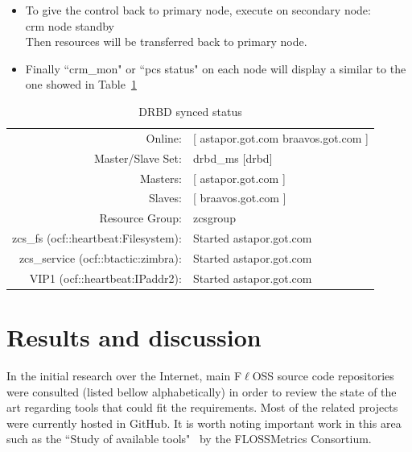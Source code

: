 \documentclass[a4paper, 12pt]{book}
\begin{document}
\begin{itemize}
	\item To give the control back to primary node, execute on secondary node:\\
			crm node standby\\
		  Then resources will be transferred back to primary node.
\end{itemize}


\begin{itemize}
	\item Finally ``crm\_mon" or ``pcs status" on each node will display a similar to the one showed in Table~\ref{table:sync}
\end{itemize}

\FloatBarrier
\begin{table}[H]
  \centering
  \begin{tabular}{ | r l | }
    \hline
      Online:                   & [ astapor.got.com braavos.got.com ]\\
      Master/Slave Set: 		& 	drbd\_ms [drbd]\\
      Masters: 					& [ astapor.got.com ]\\
      Slaves: 					& [ braavos.got.com ]\\
      Resource Group: 			& zcsgroup\\
      zcs\_fs (ocf::heartbeat:Filesystem): & Started astapor.got.com\\
      zcs\_service (ocf::btactic:zimbra):  & Started astapor.got.com\\
      VIP1 (ocf::heartbeat:IPaddr2):       & Started astapor.got.com\\
    \hline
  \end{tabular}
\caption{DRBD synced status}
\label{table:sync}
\end{table}


%
\chapter{Results and discussion}
\label{chap:results}

In the initial research over the Internet, main F$\ell$OSS source code repositories were consulted (listed bellow alphabetically) in order to review the state of the art regarding tools that could fit the requirements. Most of the related projects were currently hosted in GitHub. It is worth noting important work in this area such as the ``Study of available tools"~\cite{FMC} by the FLOSSMetrics Consortium.
\end{document}

